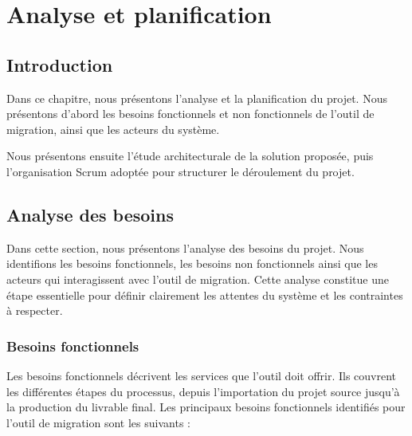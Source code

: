 
\chapter{Analyse et planification}

\section*{Introduction}

Dans ce chapitre, nous présentons l'analyse et la planification du projet. Nous présentons d'abord les besoins fonctionnels et non fonctionnels de l'outil de migration, ainsi que les acteurs du système.

Nous présentons ensuite l'étude architecturale de la solution proposée, puis l'organisation Scrum adoptée pour structurer le déroulement du projet.

\section{Analyse des besoins}

Dans cette section, nous présentons l'analyse des besoins du projet. Nous identifions les besoins fonctionnels, les besoins non fonctionnels ainsi que les acteurs qui interagissent avec l'outil de migration. Cette analyse constitue une étape essentielle pour définir clairement les attentes du système et les contraintes à respecter.

\subsection{Besoins fonctionnels}
\label{sec:besoins-fonctionnels}

Les besoins fonctionnels décrivent les services que l'outil doit offrir. Ils couvrent les différentes étapes du processus, depuis l'importation du projet source jusqu'à la production du livrable final. Les principaux besoins fonctionnels identifiés pour l'outil de migration sont les suivants :

